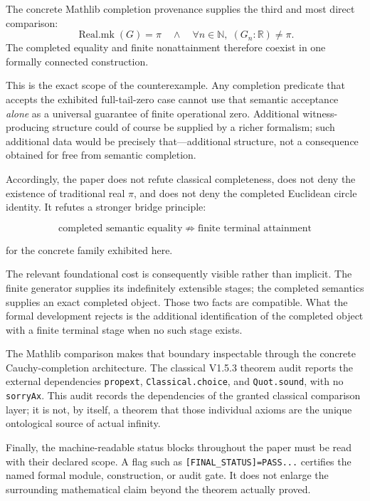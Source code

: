 \documentclass[11pt,a4paper]{article}
\begin{document}
The concrete Mathlib completion provenance supplies the third and most
direct comparison:
\[
\boxed{
\operatorname{Real.mk}(G)=\pi
\quad\land\quad
\forall n\in\mathbb N,\;(G_n:\mathbb R)\neq\pi.
}
\]
The completed equality and finite nonattainment therefore coexist in
one formally connected construction.

This is the exact scope of the counterexample.  Any completion
predicate that accepts the exhibited full-tail-zero case cannot use
that semantic acceptance \emph{alone} as a universal guarantee of
finite operational zero.  Additional witness-producing structure could
of course be supplied by a richer formalism; such additional data
would be precisely that---additional structure, not a consequence
obtained for free from semantic completion.

Accordingly, the paper does not refute classical completeness, does
not deny the existence of traditional real \(\pi\), and does not deny
the completed Euclidean circle identity.  It refutes a stronger bridge
principle:

\[
\boxed{
\text{completed semantic equality}
\;\not\Rightarrow\;
\text{finite terminal attainment}
}
\]

for the concrete family exhibited here.

The relevant foundational cost is consequently visible rather than
implicit.  The finite generator supplies its indefinitely extensible
stages; the completed semantics supplies an exact completed object.
Those two facts are compatible.  What the formal development rejects
is the additional identification of the completed object with a
finite terminal stage when no such stage exists.

The Mathlib comparison makes that boundary inspectable through the
concrete Cauchy-completion architecture.  The classical V1.5.3 theorem
audit reports the external dependencies
\texttt{propext}, \texttt{Classical.choice}, and
\texttt{Quot.sound}, with no \texttt{sorryAx}.  This audit records the
dependencies of the granted classical comparison layer; it is not, by
itself, a theorem that those individual axioms are the unique
ontological source of actual infinity.

Finally, the machine-readable status blocks throughout the paper must
be read with their declared scope.  A flag such as
\texttt{[FINAL\_STATUS]=PASS...} certifies the named formal module,
construction, or audit gate.  It does not enlarge the surrounding
mathematical claim beyond the theorem actually proved.
\end{document}

